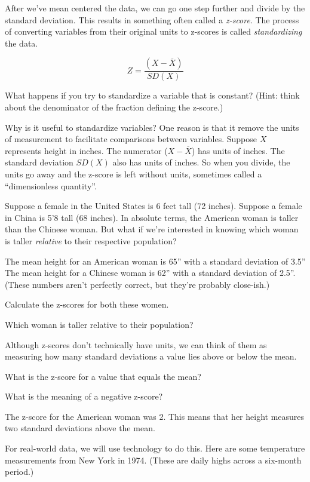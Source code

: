 \documentclass[
]{book}
\newenvironment{Shaded}{\begin{snugshade}}{\end{snugshade}}
\newcommand{\NormalTok}[1]{#1}
\newcommand{\SpecialCharTok}[1]{\textcolor[rgb]{0.00,0.00,0.00}{#1}}
\begin{document}
After we've mean centered the data, we can go one step further and divide by the standard deviation. This results in something often called a \emph{z-score}. The process of converting variables from their original units to z-scores is called \emph{standardizing} the data.

\[
Z = \frac{\left(X - \overline{X}\right)}{SD(X)}
\]

What happens if you try to standardize a variable that is constant? (Hint: think about the denominator of the fraction defining the z-score.)

Why is it useful to standardize variables? One reason is that it remove the units of measurement to facilitate comparisons between variables. Suppose \(X\) represents height in inches. The numerator (\(X - \overline{X}\)) has units of inches. The standard deviation \(SD(X)\) also has units of inches. So when you divide, the units go away and the z-score is left without units, sometimes called a ``dimensionless quantity''.

Suppose a female in the United States is 6 feet tall (72 inches). Suppose a female in China is 5'8 tall (68 inches). In absolute terms, the American woman is taller than the Chinese woman. But what if we're interested in knowing which woman is taller \emph{relative} to their respective population?

The mean height for an American woman is 65'' with a standard deviation of 3.5'' The mean height for a Chinese woman is 62'' with a standard deviation of 2.5''. (These numbers aren't perfectly correct, but they're probably close-ish.)

Calculate the z-scores for both these women.

Which woman is taller relative to their population?

Although z-scores don't technically have units, we can think of them as measuring how many standard deviations a value lies above or below the mean.

What is the z-score for a value that equals the mean?

What is the meaning of a negative z-score?

The z-score for the American woman was 2. This means that her height measures two standard deviations above the mean.

For real-world data, we will use technology to do this. Here are some temperature measurements from New York in 1974. (These are daily highs across a six-month period.)

\begin{Shaded}
\end{Shaded}
\end{document}
